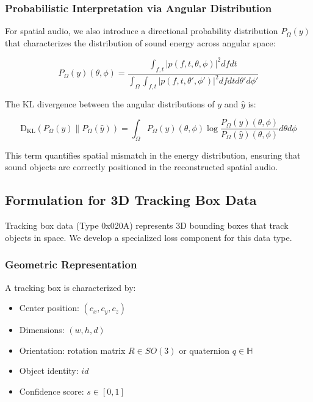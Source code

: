 \subsubsection{Probabilistic Interpretation via Angular Distribution}

For spatial audio, we also introduce a directional probability distribution $P_{\Omega}(y)$ that characterizes the distribution of sound energy across angular space:

\begin{equation}
P_{\Omega}(y)(\theta,\phi) = \frac{\int_{f,t} |p(f,t,\theta,\phi)|^2 df dt}{\int_{\Omega} \int_{f,t} |p(f,t,\theta',\phi')|^2 df dt d\theta' d\phi'}
\end{equation}

The KL divergence between the angular distributions of $y$ and $\hat{y}$ is:

\begin{equation}
\mathrm{D_{KL}}(P_{\Omega}(y) \| P_{\Omega}(\hat{y})) = \int_{\Omega} P_{\Omega}(y)(\theta,\phi) \log\frac{P_{\Omega}(y)(\theta,\phi)}{P_{\Omega}(\hat{y})(\theta,\phi)} d\theta d\phi
\end{equation}

This term quantifies spatial mismatch in the energy distribution, ensuring that sound objects are correctly positioned in the reconstructed spatial audio.

\subsection{Formulation for 3D Tracking Box Data}

Tracking box data (Type 0x020A) represents 3D bounding boxes that track objects in space. We develop a specialized loss component for this data type.

\subsubsection{Geometric Representation}

A tracking box is characterized by:
\begin{itemize}
\item Center position: $(c_x, c_y, c_z)$
\item Dimensions: $(w, h, d)$
\item Orientation: rotation matrix $R \in SO(3)$ or quaternion $q \in \mathbb{H}$
\item Object identity: $id$
\item Confidence score: $s \in [0,1]$
\end{itemize}

